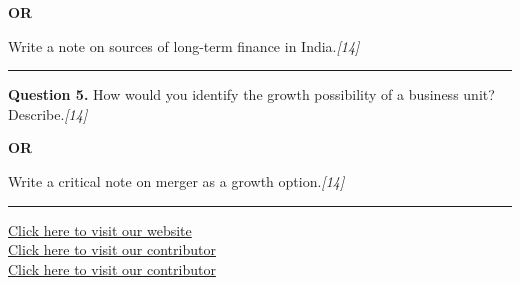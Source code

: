 \documentclass[11pt,a4paper]{article}
\newcommand{\pts}[1]{\hfill   \textit{[#1]}}
\begin{document}
\centerline{   \textbf{OR}}

Write a note on sources of long-term finance in India.\pts{14}

\medskip\rule{\linewidth}{0.2pt}




\noindent   \textbf{Question 5.}
How would you identify the growth possibility of a business unit? Describe.\pts{14}

\centerline{   \textbf{OR}}

Write a critical note on merger as a growth option.\pts{14}

\vfill
\rule{\linewidth}{0.4pt}

\begin{center}\small
\href{https://bhu-exam.vercel.app/}{Click here to visit our website}\\[4pt]
\href{https://me-aryan.vercel.app/}{Click here to visit our contributor}\\[4pt]
\href{https://quashan-me.vercel.app/}{Click here to visit our contributor}
\end{center}
\end{document}
